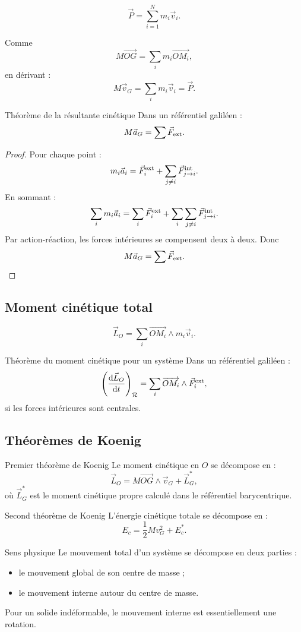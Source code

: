 \documentclass[11pt,a4paper]{article}
\newcommand{\vect}[1]{\overrightarrow{#1}}
\newcommand{\der}[2]{\frac{\mathrm{d}#1}{\mathrm{d}#2}}
\newcommand{\Rep}{\mathcal R}
\begin{document}
\[
\vec P=\sum_{i=1}^{N}m_i\vec v_i.
\]

Comme
\[
M\vect{OG}=\sum_i m_i\vect{OM_i},
\]
en dérivant :
\[
M\vec v_G=\sum_i m_i\vec v_i=\vec P.
\]

\begin{theoremBox}{Théorème de la résultante cinétique}{}
Dans un référentiel galiléen :
\[
M\vec a_G=\sum \vec F_{\rm ext}.
\]
\end{theoremBox}

\begin{proof}
Pour chaque point :
\[
m_i\vec a_i=\vec F_i^{\rm ext}+\sum_{j\neq i}\vec F_{j\to i}^{\rm int}.
\]
En sommant :
\[
\sum_i m_i\vec a_i=\sum_i\vec F_i^{\rm ext}
+\sum_i\sum_{j\neq i}\vec F_{j\to i}^{\rm int}.
\]
Par action-réaction, les forces intérieures se compensent deux à deux. Donc
\[
M\vec a_G=\sum\vec F_{\rm ext}.
\]
\end{proof}

\subsection{Moment cinétique total}

\[
\vec L_O=\sum_i \vect{OM_i}\wedge m_i\vec v_i.
\]

\begin{theoremBox}{Théorème du moment cinétique pour un système}{}
Dans un référentiel galiléen :
\[
\left(\der{\vec L_O}{t}\right)_{\Rep}
=
\sum_i \vect{OM_i}\wedge\vec F_i^{\rm ext},
\]
si les forces intérieures sont centrales.
\end{theoremBox}

\subsection{Théorèmes de Koenig}

\begin{theoremBox}{Premier théorème de Koenig}{}
Le moment cinétique en $O$ se décompose en :
\[
\vec L_O=M\vect{OG}\wedge\vec v_G+\vec L_G^*,
\]
où $\vec L_G^*$ est le moment cinétique propre calculé dans le référentiel barycentrique.
\end{theoremBox}

\begin{theoremBox}{Second théorème de Koenig}{}
L'énergie cinétique totale se décompose en :
\[
E_c=\frac12 Mv_G^2+E_c^*.
\]
\end{theoremBox}

\begin{intuitionbox}{Sens physique}{}
Le mouvement total d'un système se décompose en deux parties :
\begin{itemize}
  \item le mouvement global de son centre de masse ;
  \item le mouvement interne autour du centre de masse.
\end{itemize}
Pour un solide indéformable, le mouvement interne est essentiellement une rotation.
\end{intuitionbox}
\end{document}
